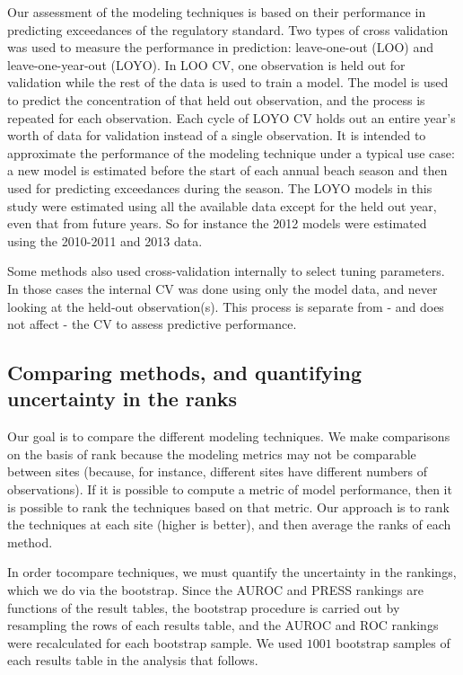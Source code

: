 \documentclass{article}\usepackage[]{graphicx}\usepackage[]{color}
\numberwithin{equation}{section}
\numberwithin{figure}{section}
\renewcommand\[{\begin{equation}}
\renewcommand\]{\end{equation}}
\begin{document}
Our assessment of the modeling techniques is based on their performance
in predicting exceedances of the regulatory standard. Two types of
cross validation was used to measure the performance in prediction:
leave-one-out (LOO) and leave-one-year-out (LOYO). In LOO CV, one
observation is held out for validation while the rest of the data
is used to train a model. The model is used to predict the concentration
of that held out observation, and the process is repeated for each
observation. Each cycle of LOYO CV holds out an entire year's worth
of data for validation instead of a single observation. It is intended
to approximate the performance of the modeling technique under a typical
use case: a new model is estimated before the start of each annual
beach season and then used for predicting exceedances during the season.
The LOYO models in this study were estimated using all the available
data except for the held out year, even that from future years. So
for instance the 2012 models were estimated using the 2010-2011 and
2013 data.

Some methods also used cross-validation internally to select tuning
parameters. In those cases the internal CV was done using only the
model data, and never looking at the held-out observation(s). This
process is separate from - and does not affect - the CV to assess
predictive performance.


\subsection{Comparing methods, and quantifying uncertainty in the ranks}

Our goal is to compare the different modeling techniques. We make
comparisons on the basis of rank because the modeling metrics may
not be comparable between sites (because, for instance, different
sites have different numbers of observations). If it is possible to
compute a metric of model performance, then it is possible to rank
the techniques based on that metric. Our approach is to rank the techniques
at each site (higher is better), and then average the ranks of each
method.

In order tocompare techniques, we must quantify the uncertainty in
the rankings, which we do via the bootstrap. Since the AUROC and PRESS
rankings are functions of the result tables, the bootstrap procedure
is carried out by resampling the rows of each results table, and the
AUROC and ROC rankings were recalculated for each bootstrap sample.
We used $1001$ bootstrap samples of each results table in the analysis
that follows.
\end{document}
